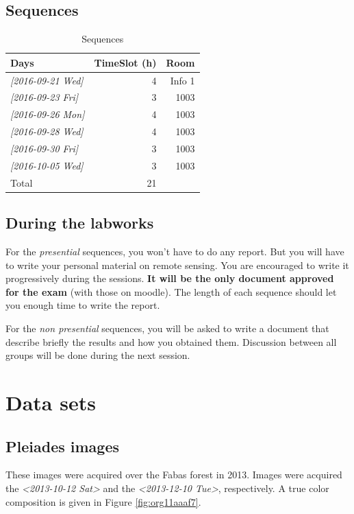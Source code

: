 \documentclass[a4paper,11pt,DIV=18]{scrartcl}
\begin{document}
\subsection{Sequences}
\label{sec:orgdd42fe9}
\begin{table}[htbp]
\caption{Sequences}
\centering
\begin{tabular}{lrr}
\toprule
Days & TimeSlot (h) & Room\\
\midrule
\textit{[2016-09-21 Wed]} & 4 & Info 1\\
\textit{[2016-09-23 Fri]} & 3 & 1003\\
\textit{[2016-09-26 Mon]} & 4 & 1003\\
\textit{[2016-09-28 Wed]} & 4 & 1003\\
\textit{[2016-09-30 Fri]} & 3 & 1003\\
\textit{[2016-10-05 Wed]} & 3 & 1003\\
\midrule
Total & 21 & \\
\bottomrule
\end{tabular}
\end{table}

\subsection{During the labworks}
\label{sec:org16a2c36}
For the \emph{presential} sequences, you won't have to do any report. But you
will have to  write your personal material on remote  sensing. You are
encouraged to write it progressively  during the sessions.  \textbf{It will be
the only  document approved for the  exam} (with those on  moodle). The
length  of each  sequence  should let  you enough  time  to write  the
report.

For  the \emph{non  presential}  sequences,  you will  be  asked  to write  a
document  that  describe briefly  the  results  and how  you  obtained
them.  Discussion between  all groups  will  be done  during the  next
session.
\section{Data sets}
\label{sec:org87a0034}
\subsection{Pleiades images}
\label{sec:org6a49d9b}
These images were acquired over the  Fabas forest in 2013. Images were
acquired   the   \textit{<2013-10-12 Sat>    }    and   the   \textit{<2013-12-10 Tue>},
respectively. A true color composition is given in Figure \ref{fig:org11aaaf7}.
\end{document}
